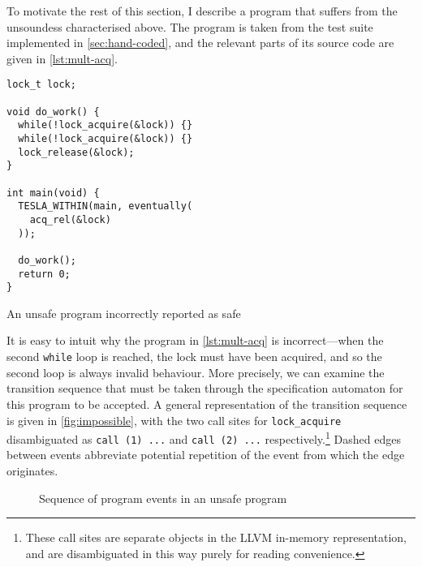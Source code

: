 To motivate the rest of this section, I describe a program that suffers
from the unsoundess characterised above. The program is taken from the
test suite implemented in \autoref{sec:hand-coded}, and the relevant
parts of its source code are given in \autoref{lst:mult-acq}.

\begin{listing}[ht]
  \begin{verbatim}
lock_t lock;

void do_work() {
  while(!lock_acquire(&lock)) {}
  while(!lock_acquire(&lock)) {}
  lock_release(&lock);
}

int main(void) {
  TESLA_WITHIN(main, eventually(
    acq_rel(&lock)
  ));

  do_work();
  return 0;
}
  \end{verbatim}
  \caption{An unsafe program incorrectly reported as safe}
  \label{lst:mult-acq}
\end{listing}

It is easy to intuit why the program in \autoref{lst:mult-acq} is
incorrect---when the second \texttt{while} loop is reached, the
lock must have been acquired, and so the second loop is always invalid
behaviour. More precisely, we can examine the transition sequence that
must be taken through the specification automaton for this program to be
accepted. A general representation of the transition sequence is given
in \autoref{fig:impossible}, with the two call sites for
\texttt{lock_acquire} disambiguated as \texttt{call (1)
...} and \texttt{call (2) ...} respectively.\footnote{These
call sites are separate objects in the LLVM in-memory representation,
and are disambiguated in this way purely for reading convenience.}
Dashed edges between events abbreviate potential repetition of the event
from which the edge originates.

\begin{figure}[ht]
  \centering
  \caption{Sequence of program events in an unsafe program}
  \label{fig:impossible}
\end{figure}

